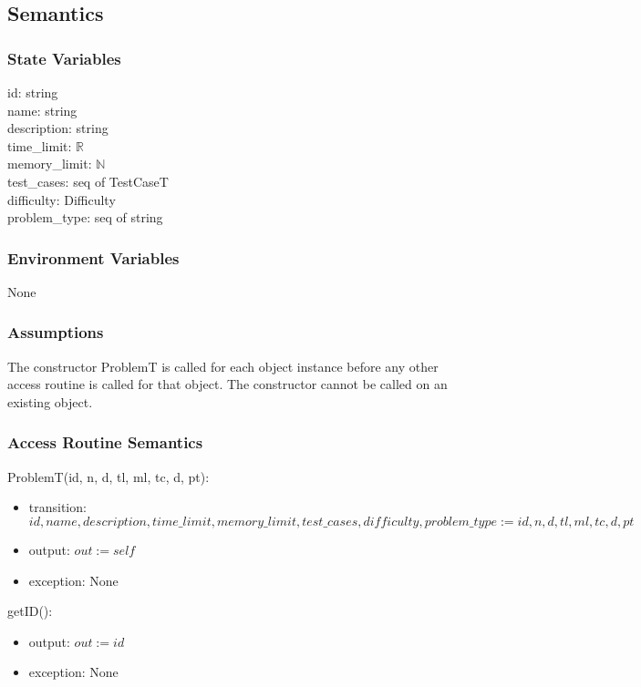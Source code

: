 \documentclass[12pt, titlepage]{article}
\begin{document}
\subsection{Semantics}

\subsubsection{State Variables}

id: string\\
name: string\\
description: string\\
time\_limit: $\mathbb{R}$\\
memory\_limit: $\mathbb{N}$\\
test\_cases: seq of TestCaseT\\
difficulty: Difficulty\\
problem\_type: seq of string

\subsubsection{Environment Variables}
None

\subsubsection{Assumptions}
The constructor ProblemT is called for each object instance before any other access routine is called for that object. The constructor cannot be called on an existing object.

\subsubsection{Access Routine Semantics}

\noindent ProblemT(id, n, d, tl, ml, tc, d, pt):
\begin{itemize}
\item transition: $id, name, description, time\_limit, memory\_limit, test\_cases, difficulty, problem\_type := id, n, d, tl, ml, tc, d, pt$
\item output: $out := self$
\item exception: None
\end{itemize}

\noindent getID():
\begin{itemize}
\item output: $out := id$
\item exception: None
\end{itemize}
\end{document}

